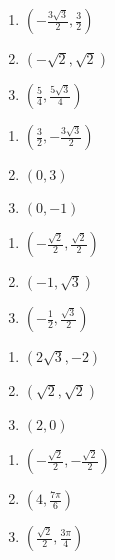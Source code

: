 \begin{multicols}{3}
\begin{enumerate}
	\item $\left(-\frac{3\sqrt{3}}{2}, \frac{3}{2}\right)$
    \item $(-\sqrt{2}, \sqrt{2})$	
    \item $\left(\frac{5}{4}, \frac{5\sqrt{3}}{4}\right)$
\end{enumerate}	\setcounter{Review}{\value{enumi}}
\end{multicols}
\begin{multicols}{3}
\begin{enumerate}	\setcounter{enumi}{\value{Review}}
    \item $\left(\frac{3}{2}, -\frac{3\sqrt{3}}{2}\right)$
    \item $(0, 3)$	
    \item $(0, -1)$	
\end{enumerate}	\setcounter{Review}{\value{enumi}}
\end{multicols}
\begin{multicols}{3}
\begin{enumerate}	\setcounter{enumi}{\value{Review}}
    \item $\left(-\frac{\sqrt{2}}{2}, \frac{\sqrt{2}}{2}\right)$
    \item $\left(-1, \sqrt{3}\right)$	
    \item $\left(-\frac{1}{2}, \frac{\sqrt{3}}{2}\right)$
\end{enumerate}	\setcounter{Review}{\value{enumi}}
\end{multicols}
\begin{multicols}{3}
\begin{enumerate}	\setcounter{enumi}{\value{Review}}
    \item $\left(2\sqrt{3}, -2\right)$	
    \item $\left(\sqrt{2}, \sqrt{2}\right)$	
    \item $(2,0)$	
\end{enumerate}	\setcounter{Review}{\value{enumi}}
\end{multicols}
\begin{multicols}{3}
\begin{enumerate}	\setcounter{enumi}{\value{Review}}
    \item $\left(-\frac{\sqrt{2}}{2}, -\frac{\sqrt{2}}{2}\right)$
    \item $\left(4, \frac{7\pi}{6}\right)$
    \item $\left(\frac{\sqrt{2}}{2}, \frac{3\pi}{4}\right)$
\end{enumerate}	\setcounter{Review}{\value{enumi}}
\end{multicols}
